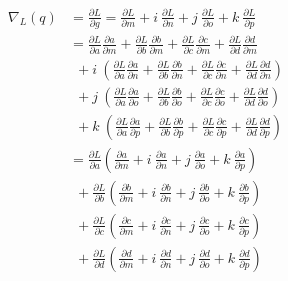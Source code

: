 \documentclass[conference]{IEEEtran}
\begin{document}
\begin{align}
\nabla_L(q) &= \frac{\partial L}{\partial g} = \frac{\partial L}{\partial m} + \textit{i}~\frac{\partial L}{\partial n} + \textit{j}~\frac{\partial L}{\partial o} + \textit{k}~\frac{\partial L}{\partial p} \\ \nonumber
&= \frac{\partial L}{\partial a}\frac{\partial a}{\partial m} + \frac{\partial L}{\partial b}\frac{\partial b}{\partial m} + \frac{\partial L}{\partial c}\frac{\partial c}{\partial m} + \frac{\partial L}{\partial d}\frac{\partial d}{\partial m} \\ \nonumber
&~~+ \textit{i}~\left( \frac{\partial L}{\partial a}\frac{\partial a}{\partial n} + \frac{\partial L}{\partial b}\frac{\partial b}{\partial n} + \frac{\partial L}{\partial c}\frac{\partial c}{\partial n} + \frac{\partial L}{\partial d}\frac{\partial d}{\partial n} \right) \\ \nonumber
&~~+ \textit{j}~\left( \frac{\partial L}{\partial a}\frac{\partial a}{\partial o} + \frac{\partial L}{\partial b}\frac{\partial b}{\partial o} + \frac{\partial L}{\partial c}\frac{\partial c}{\partial o} + \frac{\partial L}{\partial d}\frac{\partial d}{\partial o} \right) \\ \nonumber
&~~+ \textit{k}~\left( \frac{\partial L}{\partial a}\frac{\partial a}{\partial p} + \frac{\partial L}{\partial b}\frac{\partial b}{\partial p} + \frac{\partial L}{\partial c}\frac{\partial c}{\partial p} + \frac{\partial L}{\partial d}\frac{\partial d}{\partial p} \right) \\ \nonumber
&= \frac{\partial L}{\partial a} \left( \frac{\partial a}{\partial m} + \textit{i}~\frac{\partial a}{\partial n} + \textit{j}~\frac{\partial a}{\partial o} + \textit{k}~\frac{\partial a}{\partial p} \right) \\ \nonumber
&~~+ \frac{\partial L}{\partial b} \left( \frac{\partial b}{\partial m} + \textit{i}~\frac{\partial b}{\partial n} + \textit{j}~\frac{\partial b}{\partial o} + \textit{k}~\frac{\partial b}{\partial p} \right) \\ \nonumber
&~~+ \frac{\partial L}{\partial c} \left( \frac{\partial c}{\partial m} + \textit{i}~\frac{\partial c}{\partial n} + \textit{j}~\frac{\partial c}{\partial o} + \textit{k}~\frac{\partial c}{\partial p} \right) \\ \nonumber
&~~+ \frac{\partial L}{\partial d} \left( \frac{\partial d}{\partial m} + \textit{i}~\frac{\partial d}{\partial n} + \textit{j}~\frac{\partial d}{\partial o} + \textit{k}~\frac{\partial d}{\partial p} \right) \\ \nonumber

\end{align}
\end{document}

